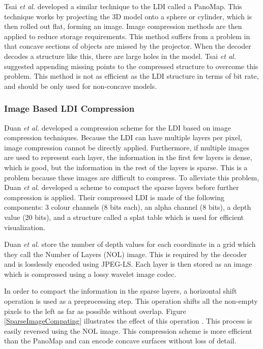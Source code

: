 Tsai \textit{et al.} \cite{Ming02Compression} developed a similar technique to the LDI called a PanoMap. This technique works by projecting the 3D model onto a sphere or cylinder, which is then rolled out flat, forming an image. Image compression methods are then applied to reduce storage requirements. This method suffers from a problem in that concave sections of objects are missed by the projector. When the decoder decodes a structure like this, there are large holes in the model. Tsai \textit{et al.} suggested appending missing points to the compressed structure to overcome this problem. This method is not as efficient as the LDI structure in terms of bit rate, and should be only used for non-concave models.

\subsubsection{Image Based LDI Compression}

Duan \textit{et al.} \cite{Duan03Compression} developed a compression scheme for the LDI based on image compression techniques. Because the LDI can have multiple layers per pixel, image compression cannot be directly applied. Furthermore, if multiple images are used to represent each layer, the information in the first few layers is dense, which is good, but the information in the rest of the layers is sparse. This is a problem because these images are difficult to compress. To alleviate this problem, Duan \textit{et al.} developed a scheme to compact the sparse layers before further compression is applied. Their compressed LDI is made of the following components: 3 colour channels (8 bits each), an alpha channel (8 bits), a depth value (20 bits), and a structure called a splat table which is used for efficient visualization.

Duan \textit{et al.} store the number of depth values for each coordinate in a grid which they call the Number of Layers (NOL) image. This is required by the decoder and is losslessly encoded using JPEG-LS. Each layer is then stored as an image which is compressed using a lossy wavelet image codec.

In order to compact the information in the sparse layers, a horizontal shift operation is used as a preprocessing step. This operation shifts all the non-empty pixels to the left as far as possible without overlap. Figure \ref{SparseImageCompating} illustrates the effect of this operation \cite{Duan03Compression}. This process is easily reversed using the NOL image. This compression scheme is more efficient than the PanoMap and can encode concave surfaces without loss of detail.

